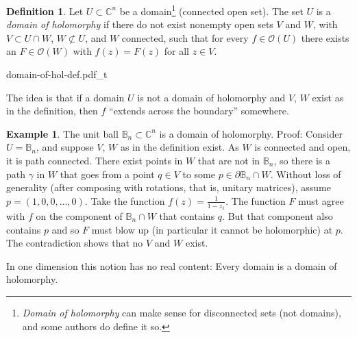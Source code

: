 \documentclass[12pt,openany]{book}
\newcommand{\C}{{\mathbb{C}}}
\newcommand{\bB}{{\mathbb{B}}}
\newcommand{\sO}{{\mathscr{O}}}
\newcommand{\myindex}[1]{#1\index{#1}}
\theoremstyle{plain}
\theoremstyle{remark}
\theoremstyle{definition}
\newtheorem{defn}[thm]{Definition}
\newenvironment{myfig}{%
    \begin{center}
}{%
    \end{center}
}
\theoremstyle{exercise}
\theoremstyle{example}
\newtheorem{example}[thm]{Example}
\begin{document}
\begin{defn} \label{defn:domainofhol}
Let $U \subset \C^n$ be a domain\footnote{\emph{Domain of
holomorphy} can make sense for disconnected sets (not domains), and some authors
do define it so.}
(connected open set).  The set $U$ is
a \emph{\myindex{domain of holomorphy}} if there do not exist
nonempty open sets
$V$ and $W$, with $V \subset U \cap W$, $W \not\subset U$, and $W$
connected, such that for every $f \in \sO(U)$ there exists an $F \in
\sO(W)$ with $f(z) = F(z)$ for all $z \in V$.
\end{defn}

\begin{myfig}
{domain-of-hol-def.pdf_t}
\end{myfig}

The idea is that if a domain $U$
is not a domain of holomorphy and $V$, $W$ exist as in the
definition, then $f$ ``extends across the boundary'' somewhere.

\begin{example}
The unit ball $\bB_n \subset \C^n$ is a domain of holomorphy.  Proof: 
Consider $U=\bB_n$, and suppose $V$, $W$ as in the definition exist.
As $W$ is
connected and open, it is path connected.  There exist
points in $W$ that are not in $\bB_n$, so there
is a path $\gamma$ in $W$ that goes
from a point $q \in V$ to some $p \in \partial \bB_n \cap W$.
Without loss of generality (after composing with
rotations, that is, unitary matrices), assume $p =
(1,0,0,\ldots,0)$.  Take the function $f(z) = \frac{1}{1-z_1}$.  
The function $F$ must agree with $f$ on the component of
$\bB_n \cap W$ that contains $q$.  But that component also contains $p$ and
so $F$ must blow up (in particular it cannot be holomorphic) at
$p$.  The contradiction shows that no $V$ and $W$ exist.
\end{example}

In one dimension this notion has no real content: Every domain is a domain
of holomorphy.
\end{document}
